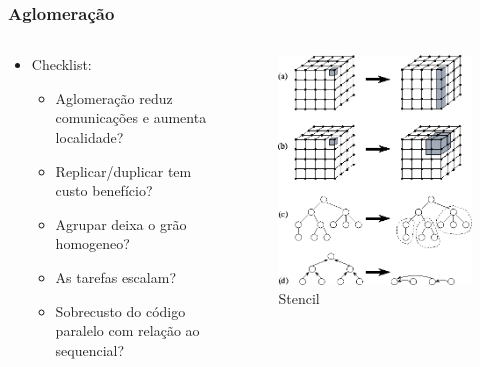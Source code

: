 \documentclass[xcolor={usenames,dvipsnames},12pt,presentation,aspectratio=169]{beamer}
\begin{document}
\begin{frame}
  \frametitle{Aglomeração}
  \vspace{-2mm}
   \begin{columns}
     \begin{column}{0.6\textwidth}
      \begin{itemize}
        \item Checklist:
          \begin{itemize}
            \item Aglomeração reduz comunicações e aumenta localidade?
            \item Replicar/duplicar tem custo benefício?
            \item Agrupar deixa o grão homogeneo?
            \item As tarefas escalam?
            \item Sobrecusto do código paralelo com relação ao sequencial?
          \end{itemize}
      \end{itemize}
     \end{column}
     \begin{column}{0.4\textwidth}
        \begin{center}
          \begin{figure}
        \includegraphics[width=\textwidth]{aglomeracao.png}
            \caption{Stencil}
          \end{figure}
        \end{center}
     \end{column}
   \end{columns}
\end{frame}
\end{document}
